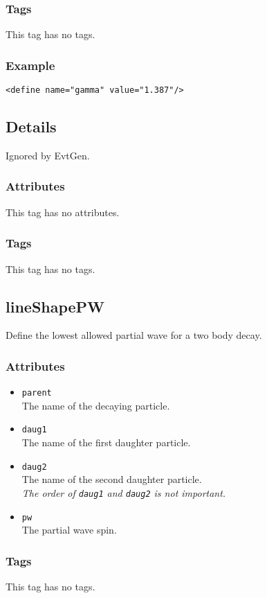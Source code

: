 \subsubsection*{Tags}
This tag has no tags.
\subsubsection*{Example}
{\footnotesize
\begin{verbatim}
<define name="gamma" value="1.387"/>
\end{verbatim}
}

\subsection{Details}
Ignored by EvtGen.
\subsubsection*{Attributes}
This tag has no attributes.
\subsubsection*{Tags}
This tag has no tags.

\subsection{lineShapePW}
Define the lowest allowed partial wave for a two body decay.
\subsubsection*{Attributes}
\begin{itemize}
\item{\tt parent}\\
      The name of the decaying particle.
\item{\tt daug1}\\
      The name of the first daughter particle.
\item{\tt daug2}\\
      The name of the second daughter particle.\\
      \emph{The order of {\tt daug1} and {\tt daug2} is not important.}
\item{\tt pw}\\
      The partial wave spin.
\end{itemize}
\subsubsection*{Tags}
This tag has no tags.
